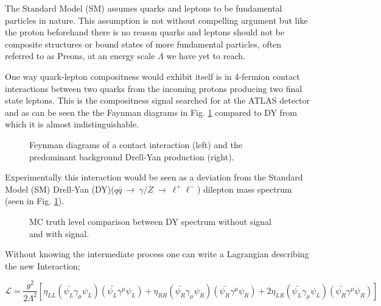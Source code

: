         The Standard Model (SM) assumes quarks and leptons to be fundamental particles in nature. This assumption is not without compelling argument but like the proton beforehand there is no reason quarks and leptons should not be composite structures or bound states of more fundamental particles, often referred to as Preons\cite{new_tests}, at an energy scale $\Lambda$ we have yet to reach. 

        One way quark-lepton compositness would exhibit itself is in 4-fermion contact interactions between two quarks from the incoming protons producing two final state leptons. This is the compositness signal searched for at the ATLAS detector and as can be seen the the Faynman diagrams in Fig. \ref{fig:fd} compared to DY from which it is almost indistinguishable.

        \begin{figure}[h]
            \begin{center}
            \end{center}
            \caption{Feynman diagrams of a contact interaction (left) and the predominant background Drell-Yan production (right).}
            \label{fig:fd}
        \end{figure}

        Experimentally this interaction would be seen as a deviation from the Standard Model (SM) Drell-Yan (DY)($q\bar{q}~\rightarrow~\gamma/Z~\rightarrow~\ell^{+}\ell^{-}$) dilepton mass spectrum (seen in Fig. \ref{fig:fd}). 

        \begin{figure}[h]
            \begin{center}
            \end{center}
            \caption{MC truth level comparison between DY spectrum without signal and with signal.}
            \label{fig:theoryInvMass}
        \end{figure}

        Without knowing the intermediate process one can write a Lagrangian describing the new Interaction; 

        \begin{equation}
            \mathcal{L} = \frac{g^{2}}{2\Lambda^{2}}
                [\eta_{LL} (\bar{\psi_{L}}\gamma_{\mu}\psi_{L}) (\bar{\psi_{L}}\gamma^{\mu}\psi_{L}) 
                + \eta_{RR} (\bar{\psi_{R}}\gamma_{\mu}\psi_{R}) (\bar{\psi_{R}}\gamma^{\mu}\psi_{R}) 
                + 2\eta_{LR} (\bar{\psi_{L}}\gamma_{\mu}\psi_{L}) (\bar{\psi_{R}}\gamma^{\mu}\psi_{R}) ]
        \end{equation}

